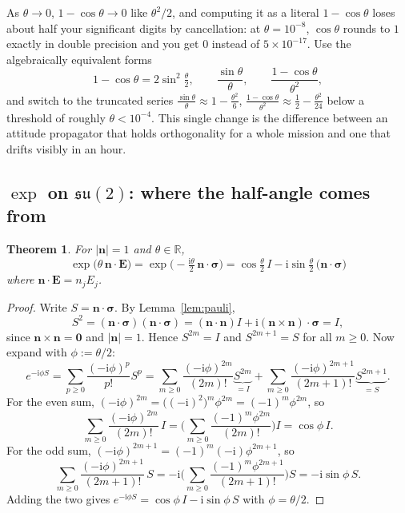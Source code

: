\documentclass[11pt]{article}
\newcommand{\su}{\mathfrak{su}}
\newcommand{\R}{\mathbb{R}}
\newcommand{\vv}[1]{\bm{#1}}
\newcommand{\ii}{\mathrm{i}}
\newcommand{\halfth}{\tfrac{\theta}{2}}
\theoremstyle{plain}
\newtheorem{theorem}{Theorem}[section]
\theoremstyle{definition}
\begin{document}
\begin{pitfall}
As $\theta\to0$, $1-\cos\theta\to0$ like $\theta^2/2$, and computing it as a literal
$1-\cos\theta$ loses about half your significant digits by cancellation: at
$\theta=10^{-8}$, $\cos\theta$ rounds to $1$ exactly in double precision and you get $0$ instead of
$5\times10^{-17}$. Use the algebraically equivalent forms
\[
1-\cos\theta=2\sin^2\halfth,\qquad \frac{\sin\theta}{\theta},\qquad \frac{1-\cos\theta}{\theta^2},
\]
and switch to the truncated series $\frac{\sin\theta}{\theta}\approx1-\frac{\theta^2}{6}$,
$\frac{1-\cos\theta}{\theta^{2}}\approx\frac12-\frac{\theta^{2}}{24}$ below a threshold of roughly
$\theta<10^{-4}$. This single change is the difference between an attitude propagator that holds
orthogonality for a whole mission and one that drifts visibly in an hour.
\end{pitfall}

\subsection{$\exp$ on $\su(2)$: where the half-angle comes from}

\begin{theorem}\label{thm:expsu2}
For $|\vv n|=1$ and $\theta\in\R$,
\[
\boxed{\ \exp\!\big(\theta\,\vv n\cdot\vv E\big)
=\exp\!\Big(-\tfrac{\ii\theta}{2}\,\vv n\cdot\vv\sigma\Big)
=\cos\halfth\,I-\ii\sin\halfth\,\big(\vv n\cdot\vv\sigma\big)\ }
\]
where $\vv n\cdot\vv E=n_jE_j$.
\end{theorem}

\begin{proof}
Write $S=\vv n\cdot\vv\sigma$. By Lemma~\ref{lem:pauli},
\[
S^2=(\vv n\cdot\vv\sigma)(\vv n\cdot\vv\sigma)=(\vv n\cdot\vv n)I+\ii(\vv n\times\vv n)\cdot\vv\sigma=I ,
\]
since $\vv n\times\vv n=\vv 0$ and $|\vv n|=1$. Hence $S^{2m}=I$ and $S^{2m+1}=S$ for all $m\ge0$.
Now expand with $\phi:=\theta/2$:
\[
e^{-\ii\phi S}=\sum_{p\ge0}\frac{(-\ii\phi)^p}{p!}S^p
=\sum_{m\ge0}\frac{(-\ii\phi)^{2m}}{(2m)!}\underbrace{S^{2m}}_{=I}
+\sum_{m\ge0}\frac{(-\ii\phi)^{2m+1}}{(2m+1)!}\underbrace{S^{2m+1}}_{=S}.
\]
For the even sum, $(-\ii\phi)^{2m}=\big((-\ii)^2\big)^m\phi^{2m}=(-1)^m\phi^{2m}$, so
\[
\sum_{m\ge0}\frac{(-\ii\phi)^{2m}}{(2m)!}\,I
=\Big(\sum_{m\ge0}\frac{(-1)^m\phi^{2m}}{(2m)!}\Big)I=\cos\phi\,I .
\]
For the odd sum, $(-\ii\phi)^{2m+1}=(-1)^m(-\ii)\phi^{2m+1}$, so
\[
\sum_{m\ge0}\frac{(-\ii\phi)^{2m+1}}{(2m+1)!}\,S
=-\ii\Big(\sum_{m\ge0}\frac{(-1)^m\phi^{2m+1}}{(2m+1)!}\Big)S=-\ii\sin\phi\,S .
\]
Adding the two gives $e^{-\ii\phi S}=\cos\phi\,I-\ii\sin\phi\,S$ with $\phi=\theta/2$.
\end{proof}
\end{document}
